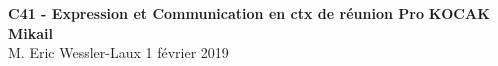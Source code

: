 \noindent
\large\textbf{C41 - Expression et Communication en ctx de réunion Pro} \hfill \textbf{KOCAK Mikail} \\
\normalsize M. Eric Wessler-Laux \hfill 1 février 2019 \\[1pt]

